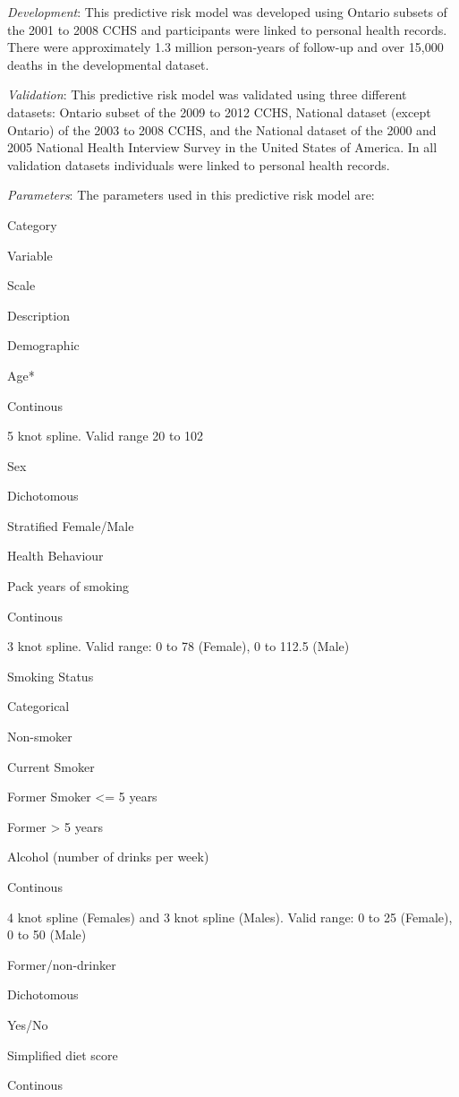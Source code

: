 \documentclass[]{book}
\begin{document}
\emph{Development}: This predictive risk model was developed using
Ontario subsets of the 2001 to 2008 CCHS and participants were linked to
personal health records. There were approximately 1.3 million
person-years of follow-up and over 15,000 deaths in the developmental
dataset.

\emph{Validation}: This predictive risk model was validated using three
different datasets: Ontario subset of the 2009 to 2012 CCHS, National
dataset (except Ontario) of the 2003 to 2008 CCHS, and the National
dataset of the 2000 and 2005 National Health Interview Survey in the
United States of America. In all validation datasets individuals were
linked to personal health records.

\emph{Parameters}: The parameters used in this predictive risk model
are:

Category

Variable

Scale

Description

Demographic

Age*

Continous

5 knot spline. Valid range 20 to 102

Sex

Dichotomous

Stratified Female/Male

Health Behaviour

Pack years of smoking

Continous

3 knot spline. Valid range: 0 to 78 (Female), 0 to 112.5 (Male)

Smoking Status

Categorical

Non-smoker

Current Smoker

Former Smoker \textless{}= 5 years

Former \textgreater{} 5 years

Alcohol (number of drinks per week)

Continous

4 knot spline (Females) and 3 knot spline (Males). Valid range: 0 to 25
(Female), 0 to 50 (Male)

Former/non-drinker

Dichotomous

Yes/No

Simplified diet score

Continous
\end{document}
